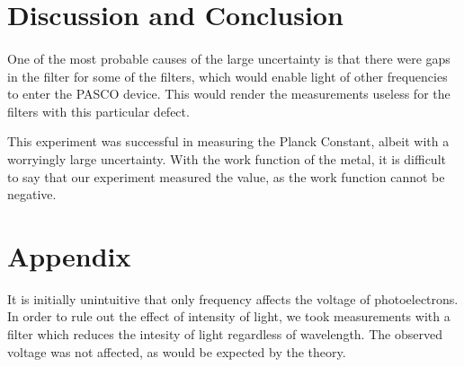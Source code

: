 \documentclass{article}
\begin{document}
\section{Discussion and Conclusion}
\paragraph{}
One of the most probable causes of the large uncertainty is that there were gaps in the filter for some of the filters, which would enable light of other frequencies to enter the PASCO device. This would render the measurements useless for the filters with this particular defect.

This experiment was successful in measuring the Planck Constant, albeit with a worryingly large uncertainty. With the work function of the metal, it is difficult to say that our experiment measured the value, as the work function cannot be negative.

\section{Appendix}

It is initially unintuitive that only frequency affects the voltage of photoelectrons. In order to rule out the effect of intensity of light, we took measurements with a filter which reduces the intesity of light regardless of wavelength. The observed voltage was not affected, as would be expected by the theory.

\printbibliography
\end{document}
